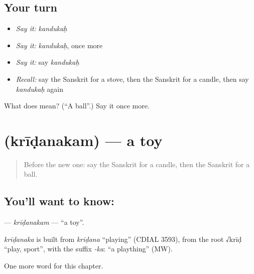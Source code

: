 \subsection*{Your turn}
\begin{itemize}
\raggedright
  \item \emph{Say it:} \emph{kandukaḥ}
  \item \emph{Say it:} \emph{kandukaḥ}, once more
  \item \emph{Say it:} say \emph{kandukaḥ}
  \item \emph{Recall:} say the Sanskrit for a stove, then the Sanskrit for a candle, then say \emph{kandukaḥ} again
\end{itemize}

\begin{tcolorbox}[breakable,colback=teal!4,colframe=teal!35!black,title={Before you move on}]
What does  mean? (\textquotedblleft{}A ball\textquotedblright{}.) Say it once more.
\end{tcolorbox}
\section[\texorpdfstring{\sk{क्रीडनकम्} (krīḍanakam)}{क्रीडनकम् (krīḍanakam)}]{ (krīḍanakam) — a toy}

\label{lesson:SA-C103-kridanakam}



\begin{quote}
Before the new one: say the Sanskrit for a candle, then the Sanskrit for a ball.
\end{quote}

\subsection*{You'll want to know: }
\textbf{} — \emph{krīḍanakam} — \textquotedblleft{}a toy\textquotedblright{}.

\begin{cousinweb}
\emph{krīḍanaka} is built from \emph{krīḍana} \textquotedblleft{}playing\textquotedblright{} (CDIAL 3593), from the root √krīḍ \textquotedblleft{}play, sport\textquotedblright{}, with the suffix \emph{-ka}: \textquotedblleft{}a plaything\textquotedblright{} (MW).
\end{cousinweb}

\begin{grammarlens}[title={What you've built}]
One more word for this chapter.
\end{grammarlens}

